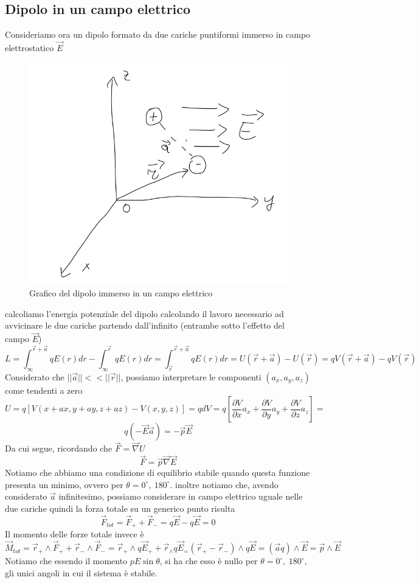 \documentclass[10pt,a4paper]{article}
\begin{document}
\subsection{Dipolo in un campo elettrico}
Consideriamo ora un dipolo formato da due cariche puntiformi immerso in campo elettrostatico $\vec{E}$
\begin{figure}[h!]
	\centering
	\includegraphics[width=0.5\linewidth]{images/dipolo_campo_elettrico}
	\caption{Grafico del dipolo immerso in un campo elettrico}
	\label{fig:dipolocampoelettrico}
\end{figure}
\FloatBarrier
calcoliamo l'energia potenziale del dipolo calcolando il lavoro necessario ad avvicinare le due cariche partendo dall'infinito (entrambe sotto l'effetto del campo $\vec{E}$)
\[L = \int_{\infty}^{\vec{r}+\vec{a}} qE(r) dr -\int_{\infty}^{\vec{r}} qE(r) dr =\int_{\vec{r}}^{\vec{r}+\vec{a}} qE(r) dr= U(\vec{r}+\vec{a})-U(\vec{r}) = qV(\vec{r}+\vec{a})-qV(\vec{r})\]
Considerato che $||\vec{a}||<<||\vec{r}||$, possiamo interpretare le componenti \((a_x, a_y, a_z)\) come tendenti a zero
\[U = q[V(x+ax, y+ay, z+az)-V(x, y, z)] = qdV = q\left[\frac{\partial V}{\partial x} a_x + \frac{\partial V}{\partial y}a_y + \frac{\partial V}{\partial z}a_z\right] =\]
\[ q(-\vec{E}\vec{a}) = -\vec{p}\vec{E}\]
Da cui segue, ricordando che \(\vec{F} = \vec{\nabla} U\)
\[\vec{F} = \vec{p}\vec{\nabla}\vec{E}\]
Notiamo che abbiamo una condizione di equilibrio stabile quando questa funzione presenta un minimo, ovvero per \(\theta= 0^\circ,\ 180^\circ\). inoltre notiamo che, avendo considerato $\vec{a}$ infinitesimo, possiamo considerare in campo elettrico uguale nelle due cariche quindi la forza totale su un generico punto risulta 
\[\vec{F}_{tot} =\vec{F}_++\vec{F}_- = q\vec{E}-q\vec{E} = 0\]
Il momento delle forze totale invece è
\[\vec{M}_{tot} = \vec{r}_+\wedge\vec{F}_+ + \vec{r}_-\wedge\vec{F}_- = \vec{r}_+\wedge q\vec{E}_+ + \vec{r}_\wedge q\vec{E}_ = (\vec{r}_+ - \vec{r}_-)\wedge q \vec{E} = (\vec{a}q)\wedge\vec{E} = \vec{p}\wedge\vec{E}\]
Notiamo che essendo il momento \(pE\sin\theta\), si ha che esso è nullo per \(\theta= 0^\circ,\ 180^\circ\), gli unici angoli in cui il sistema è stabile. 
\end{document}

